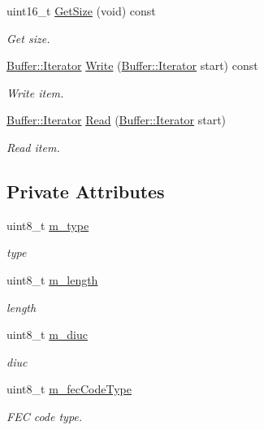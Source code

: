 \begin{DoxyCompactItemize}
uint16\+\_\+t \hyperlink{classns3_1_1OfdmDlBurstProfile_ab61dacc58c2a5a6f8a6fed1582866b0a}{Get\+Size} (void) const 
\begin{DoxyCompactList}\small\item\em Get size. \end{DoxyCompactList}\item 
\hyperlink{classns3_1_1Buffer_1_1Iterator}{Buffer\+::\+Iterator} \hyperlink{classns3_1_1OfdmDlBurstProfile_a04730ec666ff0d775af639ae8b47aeb7}{Write} (\hyperlink{classns3_1_1Buffer_1_1Iterator}{Buffer\+::\+Iterator} start) const 
\begin{DoxyCompactList}\small\item\em Write item. \end{DoxyCompactList}\item 
\hyperlink{classns3_1_1Buffer_1_1Iterator}{Buffer\+::\+Iterator} \hyperlink{classns3_1_1OfdmDlBurstProfile_ac748d62c5f8e5af60f4ae1fd5367e4bc}{Read} (\hyperlink{classns3_1_1Buffer_1_1Iterator}{Buffer\+::\+Iterator} start)
\begin{DoxyCompactList}\small\item\em Read item. \end{DoxyCompactList}\end{DoxyCompactItemize}
\subsection*{Private Attributes}
\begin{DoxyCompactItemize}
\item 
uint8\+\_\+t \hyperlink{classns3_1_1OfdmDlBurstProfile_afade9f6d4968257e2d707fefb724db1a}{m\+\_\+type}
\begin{DoxyCompactList}\small\item\em type \end{DoxyCompactList}\item 
uint8\+\_\+t \hyperlink{classns3_1_1OfdmDlBurstProfile_ad642fbb6fdbf3225b68f565e26775624}{m\+\_\+length}
\begin{DoxyCompactList}\small\item\em length \end{DoxyCompactList}\item 
uint8\+\_\+t \hyperlink{classns3_1_1OfdmDlBurstProfile_aeea265c163914bbfc45936dcee9fa757}{m\+\_\+diuc}
\begin{DoxyCompactList}\small\item\em diuc \end{DoxyCompactList}\item 
uint8\+\_\+t \hyperlink{classns3_1_1OfdmDlBurstProfile_ad578a18b0de8307a99ad64eec0537be4}{m\+\_\+fec\+Code\+Type}
\begin{DoxyCompactList}\small\item\em F\+EC code type. \end{DoxyCompactList}\end{DoxyCompactItemize}


